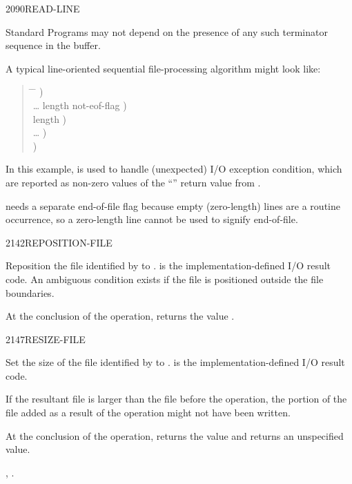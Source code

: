 \begin{worddef}{2090}{READ-LINE}
\begin{defer}
		Standard Programs may not depend on the presence of any such
		terminator sequence in the buffer.

		A typical line-oriented sequential file-processing algorithm
		might look like:

		\begin{quote}\ttfamily{}
		  \begin{tabbing}
			\tab \= \hspace{12em} \= \kill
							\>\>  ) \\
			\> {\ldots}  
										\>	 \word{p} length not-eof-flag ) \\
			 				\>\>  length ) \\
			\> {\ldots}					\>	  ) \\
			 	\>\>  ) \\
		  \end{tabbing}
		\end{quote}

		In this example,  is used to handle
		(unexpected) I/O exception condition, which are reported as
		non-zero values of the ``'' return value from
		.

		 needs a separate end-of-file flag because
		empty (zero-length) lines are a routine occurrence, so a
		zero-length line cannot be used to signify end-of-file.
	\end{defer}
\end{worddef}


\begin{worddef}{2142}{REPOSITION-FILE}
\item {}

	Reposition the file identified by  to .
	 is the implementation-defined I/O result code. An
	ambiguous condition exists if the file is positioned outside
	the file boundaries.

	At the conclusion of the operation, 
	returns the value .
\end{worddef}


\begin{worddef}{2147}{RESIZE-FILE}
\item {}

	Set the size of the file identified by  to
	.  is the implementation-defined I/O result
	code.

	If the resultant file is larger than the file before the
	operation, the portion of the file added as a result of the
	operation might not have been written.

	At the conclusion of the operation,  returns
	the value  and  returns an
	unspecified value.

\see {},
	.
\end{worddef}



